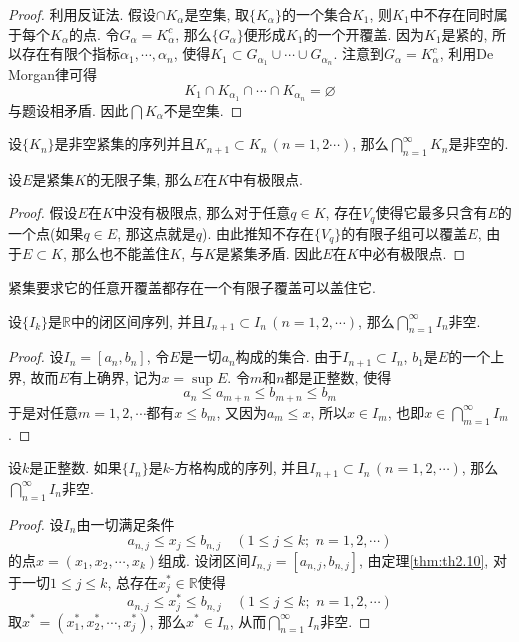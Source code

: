 \documentclass[cn,12pt,math=mtpro2,citestyle=gb7714-2015,bibstyle=gb7714-2015,twocol]{elegantbook}
\newcommand{\R}{\mathbb{R}}
\let\emptyset\varnothing
\begin{document}
\begin{proof}
  利用反证法. 假设$\cap K_\alpha$是空集, 取$\{K_\alpha\}$的一个集合$K_1$, 则$K_1$中不存在同时属于每个$K_\alpha$的点. 令$G_\alpha=K_\alpha^c$, 那么$\{G_\alpha\}$便形成$K_1$的一个开覆盖. 因为$K_1$是紧的, 所以存在有限个指标$\alpha_1,\cdots,\alpha_n$, 使得$K_1\subset G_{\alpha_1}\cup\cdots\cup G_{\alpha_n}$. 注意到$G_\alpha=K_\alpha^c$, 利用De Morgan律可得
  $$K_1\cap K_{\alpha_1}\cap\cdots\cap K_{\alpha_n}=\emptyset$$
  与题设相矛盾. 因此$\bigcap K_\alpha$不是空集.


\end{proof}
\begin{corollary}\label{cor:cor1}
设$\{K_n\}$是非空紧集的序列并且$K_{n+1}\subset K_n\,(n=1,2\cdots)$, 那么$ \bigcap_{n=1}^\infty K_n$是非空的.
\end{corollary}
\begin{theorem}\label{thm:th2.9}
  设$E$是紧集$K$的无限子集, 那么$E$在$K$中有极限点.
\end{theorem}
\begin{proof}
  假设$E$在$K$中没有极限点, 那么对于任意$q\in K$, 存在$V_q$使得它最多只含有$E$的一个点(如果$q\in E$, 那这点就是$q$). 由此推知不存在$\{V_q\}$的有限子组可以覆盖$E$, 由于$E\subset K$, 那么也不能盖住$K$, 与$K$是紧集矛盾. 因此$E$在$K$中必有极限点.
\end{proof}
\begin{remark}
紧集要求它的任意开覆盖都存在一个有限子覆盖可以盖住它.
\end{remark}
\begin{theorem}[Cantor闭区间套定理]\label{thm:th2.10}
  设$\{I_k\}$是$\R$中的闭区间序列, 并且$I_{n+1}\subset I_n\,(n=1,2,\cdots)$, 那么$ \bigcap_{n=1}^\infty I_n$非空.
\end{theorem}
\begin{proof}
  设$I_n=[a_n,b_n]$, 令$E$是一切$a_n$构成的集合. 由于$I_{n+1}\subset I_n$, $b_1$是$E$的一个上界, 故而$E$有上确界, 记为$x=\sup E$. 令$m$和$n$都是正整数, 使得
  $$a_n\leq a_{m+n}\leq b_{m+n}\leq b_m$$
  于是对任意$m=1,2,\cdots$都有$x\leq b_m$, 又因为$a_m\leq x$, 所以$x\in I_m$, 也即$x\in \bigcap_{m=1}^\infty I_m$.
\end{proof}
\begin{theorem}\label{thm:th2.11}
  设$k$是正整数. 如果$\{I_n\}$是$k$-方格构成的序列, 并且$I_{n+1}\subset I_n\,(n=1,2,\cdots)$, 那么$ \bigcap_{n=1}^\infty I_n$非空.
\end{theorem}
\begin{proof}
  设$I_n$由一切满足条件
  $$a_{n,j}\leq x_j \leq b_{n,j}\quad (1\leq j\leq k;\,\,n=1,2,\cdots)$$
  的点$x=(x_1,x_2,\cdots,x_k)$组成. 设闭区间$I_{n,j}=[a_{n,j},b_{n,j}]$, 由定理\ref{thm:th2.10}, 对于一切$1\leq j \leq k$,  总存在$x_j^\ast \in \R$使得
  $$a_{n,j}\leq x^\ast_j\leq b_{n,j}\quad (1\leq j\leq k;\,\,n=1,2,\cdots)$$
  取$x^\ast=(x_1^\ast,x_2^\ast,\cdots,x_j^\ast)$, 那么$x^\ast\in I_n$, 从而$ \bigcap_{n=1}^\infty I_n$非空.
\end{proof}
\end{document}
